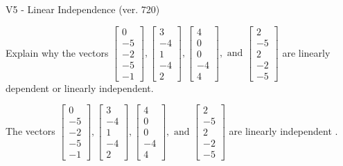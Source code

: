 \begin{exercise}
  \begin{exerciseTitle}V5 - Linear Independence (ver. 720)\end{exerciseTitle}
  \begin{exerciseStatement}
    Explain why the vectors \(\left[\begin{array}{r}
0 \\
-5 \\
-2 \\
-5 \\
-1
\end{array}\right] , \left[\begin{array}{r}
3 \\
-4 \\
1 \\
-4 \\
2
\end{array}\right] , \left[\begin{array}{r}
4 \\
0 \\
0 \\
-4 \\
4
\end{array}\right] , \text{ and } \left[\begin{array}{r}
2 \\
-5 \\
2 \\
-2 \\
-5
\end{array}\right]\) are linearly dependent or linearly independent.	


  \end{exerciseStatement}
  \begin{exerciseAnswer}
   The vectors \(\left[\begin{array}{r}
0 \\
-5 \\
-2 \\
-5 \\
-1
\end{array}\right] , \left[\begin{array}{r}
3 \\
-4 \\
1 \\
-4 \\
2
\end{array}\right] , \left[\begin{array}{r}
4 \\
0 \\
0 \\
-4 \\
4
\end{array}\right] , \text{ and } \left[\begin{array}{r}
2 \\
-5 \\
2 \\
-2 \\
-5
\end{array}\right]\) are 
  	 linearly independent  .
  


  \end{exerciseAnswer}
\end{exercise}